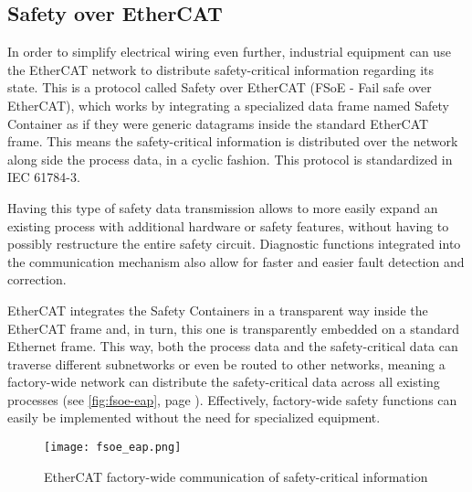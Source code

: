 \subsection{Safety over EtherCAT}

In order to simplify electrical wiring even further, industrial equipment can use the EtherCAT network to distribute safety-critical information regarding its state.
This is a protocol called Safety over EtherCAT (FSoE - Fail safe over EtherCAT), which works by integrating a specialized data frame named Safety Container as if they were generic datagrams inside the standard EtherCAT frame.
This means the safety-critical information is distributed over the network along side the process data, in a cyclic fashion.
This protocol is standardized in IEC 61784-3.

Having this type of safety data transmission allows to more easily expand an existing process with additional hardware or safety features, without having to possibly restructure the entire safety circuit.
Diagnostic functions integrated into the communication mechanism also allow for faster and easier fault detection and correction.

EtherCAT integrates the Safety Containers in a transparent way inside the EtherCAT frame and, in turn, this one is transparently embedded on a standard Ethernet frame.
This way, both the process data and the safety-critical data can traverse different subnetworks or even be routed to other networks, meaning a factory-wide network can distribute the safety-critical data across all existing processes (see \autoref{fig:fsoe-eap}, page \pageref{fig:fsoe-eap}).
Effectively, factory-wide safety functions can easily be implemented without the need for specialized equipment.

\begin{figure}[htp]
	\centering
	\texttt{[image: fsoe\_eap.png]}
	\caption{EtherCAT factory-wide communication of safety-critical information \cite{technology:fsoe}}
	\label{fig:fsoe-eap}
\end{figure}
